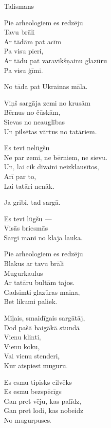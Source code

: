 \documentclass[14pt]{extarticle}
\begin{document}
\newpage

{\large \sc Talismans}

Pie arheologiem es redzēju\\
Tavu brāli\\
Ar tādām pat acīm\\
Pa visu pieri,\\
Ar tādu pat varavīkšņainu glazūru\\
Pa visu ģīmi.

No tāda pat Ukrainas māla.

Viņš sargāja zemi no krusām\\
Bērnus no čūskām,\\
Sievas no neauglības\\
Un pilsētas vārtus no tatāriem.

Es tevi nelūgšu\\
Ne par zemi, ne bērniem, ne sievu.\\
Un, lai cik dīvaini neizklausītos,\\
Arī par to,\\
Lai tatāri nenāk.

Ja gribi, tad sargā.

Es tevi lūgšu ---\\
Visās briesmās\\
Sargi mani no klaja lauka.

Pie arheologiem es redzēju\\
Blakus ar tavu brāli\\
Mugurkaulus\\
Ar tatāru bultām tajos.\\
Gadsimti glazūras maina,\\
Bet likumi paliek.

Mīļais, smaidīgais sargātāj,\\
Dod pašā baigākā stundā\\
Vienu klinti,\\
Vienu koku,\\
Vai vienu stenderi,\\
Kur atspiest muguru.

Es esmu tipisks cilvēks ---\\
Es esmu bezspēcīgs\\
Gan pret vēju, kas palīdz,\\
Gan pret lodi, kas nobeidz\\
No mugurpuses.




\end{document}
